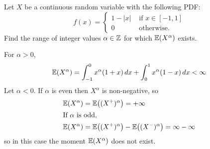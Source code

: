 \begin{exercise}
\begin{questions}
\question

Let $X$ be a continuous random variable with the following PDF:
\[
f(x) = \begin{cases}
	1-|x|	& \text{ if } x\in[-1,1] \\
	0		& \text{ otherwise.}
\end{cases}
\]
Find the range of integer values $\alpha\in\mathbb{Z}$ for which $\mathbb{E}(X^{\alpha})$ exists.

\begin{answer}
For $\alpha>0$,
\[
\mathbb{E}(X^{\alpha}) = \int_{-1}^{0}x^{\alpha}(1+x)\,dx + \int_{0}^{1}x^{\alpha}(1-x)\,dx < \infty
\]
Let $\alpha < 0$. If $\alpha$ is even then $X^\alpha$ is non-negative, so
\begin{align*}
\mathbb{E}(X^\alpha)
	& = \mathbb{E}\big((X^{+})^{\alpha}\big) = +\infty\\
\intertext{If $\alpha$ is odd,}
\mathbb{E}(X^\alpha)
	& = \mathbb{E}\big((X^{+})^{\alpha}\big) - \mathbb{E}\big((X^{-})^{\alpha}\big) 
		= \infty - \infty 
\end{align*}
so in this case the moment $\mathbb{E}(X^\alpha)$ does not exist.
\end{answer} 



\end{questions}
\end{exercise}

